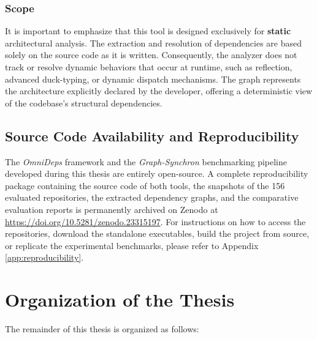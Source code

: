 \subsubsection{Scope}
It is important to emphasize that this tool is designed exclusively
for \textbf{static} architectural analysis. The extraction and
resolution of dependencies are based solely on the source code as it
is written. Consequently, the analyzer does not track or resolve
dynamic behaviors that occur at runtime, such as reflection, advanced
duck-typing, or dynamic dispatch mechanisms. The graph represents the
architecture explicitly declared by the developer, offering a
deterministic view of the codebase's structural dependencies.

\subsection{Source Code Availability and Reproducibility}
The \textit{OmniDeps} framework and the \textit{Graph-Synchron}
benchmarking pipeline developed during this thesis are entirely
open-source. A complete reproducibility package containing the
source code of both tools, the snapshots of the 156 evaluated
repositories, the extracted dependency graphs, and the comparative
evaluation reports is permanently archived on Zenodo at
\url{https://doi.org/10.5281/zenodo.23315197}. For instructions on
how to access the repositories, download the standalone executables,
build the project from source, or replicate the experimental
benchmarks, please refer to Appendix \ref{app:reproducibility}.

\section{Organization of the Thesis}

The remainder of this thesis is organized as follows:

